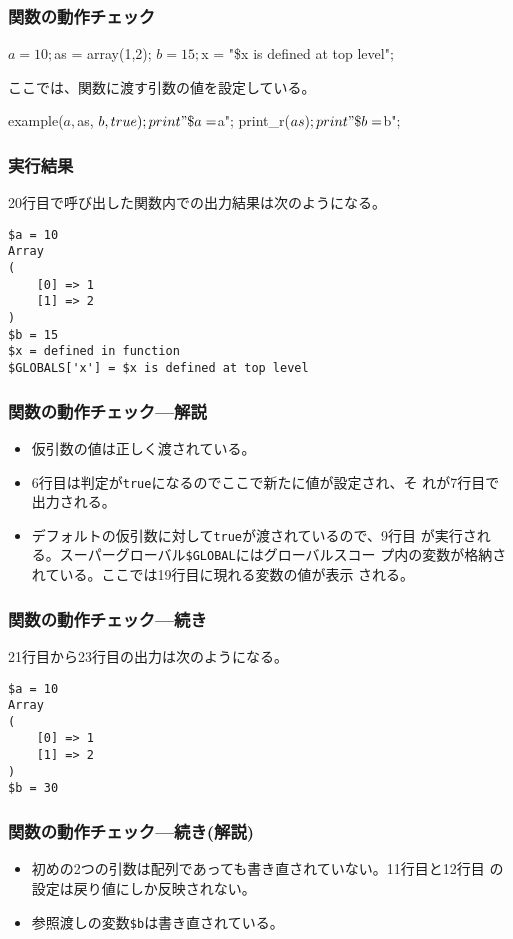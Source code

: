 \begin{frame}[containsverbatim]
\frametitle{関数の動作チェック}
\begin{listingcont}
$a = 10;
$as = array(1,2);
$b = 15;
$x = "\$x is defined at top level";
\end{listingcont}
ここでは、関数に渡す引数の値を設定している。
\begin{listingcont}
example($a, $as, $b, true);
print "\$a = $a\n";
print_r($as);
print "\$b = $b\n";
\end{listingcont}
\end{frame}
\begin{frame}[containsverbatim]
 \frametitle{実行結果}
 20行目で呼び出した関数内での出力結果は次のようになる。
\begin{verbatim}
$a = 10
Array
(
    [0] => 1
    [1] => 2
)
$b = 15
$x = defined in function
$GLOBALS['x'] = $x is defined at top level
\end{verbatim}
\end{frame}
\begin{frame}[containsverbatim]
\frametitle{関数の動作チェック---解説}
\begin{itemize}
 \item 仮引数の値は正しく渡されている。
 \item 6行目は判定が\texttt{true}になるのでここで新たに値が設定され、そ
       れが7行目で出力される。
 \item デフォルトの仮引数に対して\texttt{true}が渡されているので、9行目
       が実行される。スーパーグローバル\verb+$GLOBAL+にはグローバルスコー
       プ内の変数が格納されている。ここでは19行目に現れる変数の値が表示
       される。
\end{itemize}
\end{frame}
\begin{frame}[containsverbatim]
\frametitle{関数の動作チェック---続き}
21行目から23行目の出力は次のようになる。
\begin{verbatim}
$a = 10
Array
(
    [0] => 1
    [1] => 2
)
$b = 30
\end{verbatim}
\end{frame}
\begin{frame}[containsverbatim]
\frametitle{関数の動作チェック---続き(解説)}
\begin{itemize}
 \item 初めの2つの引数は配列であっても書き直されていない。11行目と12行目
       の設定は戻り値にしか反映されない。
 \item 参照渡しの変数\verb+$b+は書き直されている。
\end{itemize}
\end{frame}

